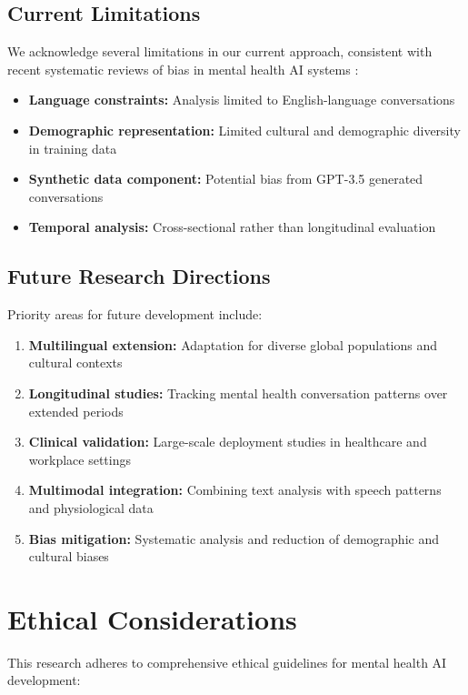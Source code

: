 \documentclass[11pt,twocolumn]{article}
\begin{document}
\subsection{Current Limitations}

We acknowledge several limitations in our current approach, consistent with recent systematic reviews of bias in mental health AI systems \cite{patel2023bias}:

\begin{itemize}
\item \textbf{Language constraints:} Analysis limited to English-language conversations
\item \textbf{Demographic representation:} Limited cultural and demographic diversity in training data
\item \textbf{Synthetic data component:} Potential bias from GPT-3.5 generated conversations
\item \textbf{Temporal analysis:} Cross-sectional rather than longitudinal evaluation
\end{itemize}

\subsection{Future Research Directions}

Priority areas for future development include:

\begin{enumerate}
\item \textbf{Multilingual extension:} Adaptation for diverse global populations and cultural contexts
\item \textbf{Longitudinal studies:} Tracking mental health conversation patterns over extended periods
\item \textbf{Clinical validation:} Large-scale deployment studies in healthcare and workplace settings
\item \textbf{Multimodal integration:} Combining text analysis with speech patterns and physiological data
\item \textbf{Bias mitigation:} Systematic analysis and reduction of demographic and cultural biases
\end{enumerate}

\section{Ethical Considerations}

This research adheres to comprehensive ethical guidelines for mental health AI development:
\end{document}

